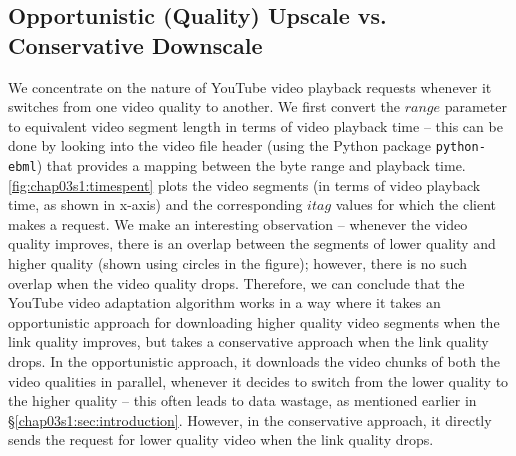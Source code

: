 \subsection{Opportunistic (Quality) Upscale vs. Conservative Downscale} We concentrate on the nature of YouTube video playback requests whenever it switches from one video quality to another.
We first convert the $range$ parameter to equivalent video segment length in terms of video playback time -- this can be done by looking into the video file header (using the Python package \texttt{python-ebml}) that provides a mapping between the byte range and playback time.
\fig\ref{fig:chap03s1:timespent} plots the video segments (in terms of video playback time, as shown in x-axis) and the corresponding $itag$ values for which the client makes a request.
We make an interesting observation -- whenever the video quality improves, there is an overlap between the segments of lower quality and higher quality (shown using circles in the figure); however, there is no such overlap when the video quality drops.
Therefore, we can conclude that the YouTube video adaptation algorithm works in a way where it takes an opportunistic approach for downloading higher quality video segments when the link quality improves, but takes a conservative approach when the link quality drops.
In the opportunistic approach, it downloads the video chunks of both the video qualities in parallel, whenever it decides to switch from the lower quality to the higher quality -- this often leads to data wastage, as mentioned earlier in \S\ref{chap03s1:sec:introduction}.
However, in the conservative approach, it directly sends the request for lower quality video when the link quality drops.

